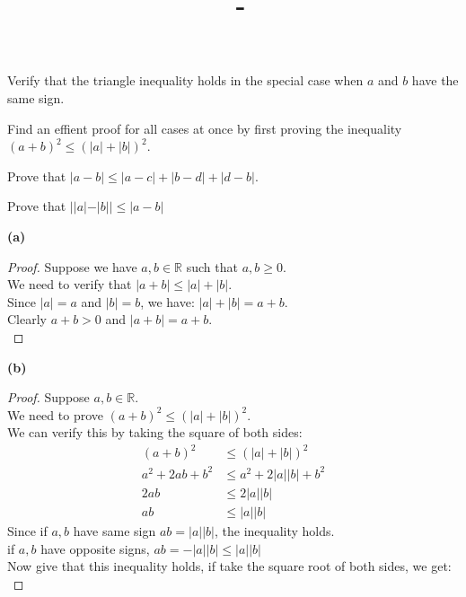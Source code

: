 \documentclass[answers,12pt,addpoints]{exam}
\author{\name}
\title{\course \ - \assignment}
\begin{document}
\maketitle


\newpage
\begin{questions}
    \question 
    \begin{parts}
        \item Verify that the triangle inequality holds in the special case when $a$ and $b$ have the same sign.
        \item Find an effient proof for all cases at once by first proving the inequality $(a+b)^2 \leq (|a|+|b|)^2$.
        \item Prove that $|a-b| \leq |a-c| + |b-d| + |d-b|$.
        \item Prove that $||a|-|b|| \leq |a-b|$
    \end{parts} 
    \begin{solution}
        \textbf{(a)}
    \begin{proof}
        Suppose we have $a,b \in \mathbb{R}$ such that $a,b \geq 0$. \\
        We need to verify that $|a+b| \leq |a| + |b|$. \\
        Since $|a| = a$ and $|b| = b$, we have: $|a|+|b| = a+b$. \\
        Clearly $a+b > 0$ and $|a+b| = a+b$. \\
    \end{proof}
    \textbf{(b)}
    \begin{proof}
        Suppose $a,b \in \mathbb{R}$. \\
        We need to prove $(a+b)^2 \leq (|a|+|b|)^2$. \\
        We can verify this by taking the square of both sides: \\
        \begin{align*}
            (a+b)^2 &\leq (|a|+|b|)^2 \\
            a^2 + 2ab + b^2 &\leq a^2 + 2|a||b| + b^2 \\
            2ab &\leq 2|a||b| \\
            ab &\leq |a||b|
        \end{align*}
        Since if $a,b$ have same sign $ab = |a||b|$, the inequality holds. \\
        if $a,b$ have opposite signs, $ab = -|a||b| \leq |a||b|$ \\
        Now give that this inequality holds, if take the square root of both sides, we get: \\

\end{proof}
\end{solution}
\end{questions}
\end{document}

